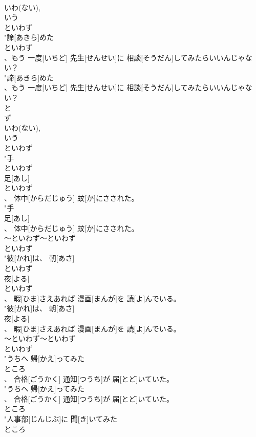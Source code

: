 \documentclass[8pt]{extreport}
\begin{document}
\begin{CJK}{UTF8}{min}
\\	いわ(ない), 
\\	いう	
\\	といわず
\\	"諦[あきら]めた
\\	といわず
\\	、もう 一度[いちど] 先生[せんせい]に 相談[そうだん]してみたらいいんじゃない？
\\	"諦[あきら]めた
\\	、もう 一度[いちど] 先生[せんせい]に 相談[そうだん]してみたらいいんじゃない？
\\	と 
\\	ず 
\\	いわ(ない), 
\\	いう	
\\	といわず
\\	"手
\\	といわず
\\	足[あし]
\\	といわず
\\	、 体中[からだじゅう] 蚊[か]にさされた。
\\	"手
\\	足[あし]
\\	、 体中[からだじゅう] 蚊[か]にさされた。
\\	～といわず～といわず	
\\	といわず
\\	"彼[かれ]は、 朝[あさ]
\\	といわず
\\	夜[よる]
\\	といわず
\\	、 暇[ひま]さえあれば 漫画[まんが]を 読[よ]んでいる。
\\	"彼[かれ]は、 朝[あさ]
\\	夜[よる]
\\	、 暇[ひま]さえあれば 漫画[まんが]を 読[よ]んでいる。
\\	～といわず～といわず	
\\	といわず
\\	"うちへ 帰[かえ]ってみた
\\	ところ
\\	、 合格[ごうかく] 通知[つうち]が 届[とど]いていた。
\\	"うちへ 帰[かえ]ってみた
\\	、 合格[ごうかく] 通知[つうち]が 届[とど]いていた。
\\	ところ
\\	"人事部[じんじぶ]に 聞[き]いてみた
\\	ところ

\end{CJK}
\end{document}

